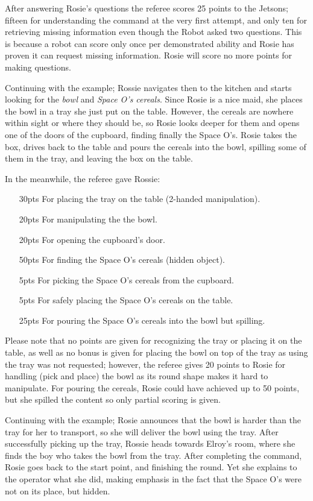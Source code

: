 After answering Rosie's questions the referee scores 25 points to the Jetsons; fifteen for understanding the command at the very first attempt, and only ten for retrieving missing information even though the Robot asked two questions. This is because a robot can score only once per demonstrated ability and Rosie has proven it can request missing information. Rosie will score no more points for making questions.

Continuing with the example; Rossie navigates then to the kitchen and starts looking for the \textit{bowl} and \textit{Space O's cereals}. Since Rosie is a nice maid, she places the bowl in a tray she just put on the table. However, the cereals are nowhere within sight or where they should be, so Rosie looks deeper for them and opens one of the doors of the cupboard, finding finally the Space O's. Rosie takes the box, drives back to the table and pours the cereals into the bowl, spilling some of them in the tray, and leaving the box on the table.

In the meanwhile, the referee gave Rossie:
\begin{itemize}
	\item[30pts] For placing the tray on the table (2-handed manipulation).
	\item[20pts] For manipulating the the bowl.
	\item[20pts] For opening the cupboard's door.
	\item[50pts] For finding the Space O's cereals (hidden object).
	\item[ 5pts] For picking the Space O's cereals from the cupboard.
	\item[ 5pts] For safely placing the Space O's cereals on the table.
	\item[25pts] For pouring the Space O's cereals into the bowl but spilling.
\end{itemize}

Please note that no points are given for recognizing the tray or placing it on the table, as well as no bonus is given for placing the bowl on top of the tray as using the tray was not requested; however, the referee gives 20 points to Rosie for handling (pick and place) the bowl as its round shape makes it hard to manipulate. For pouring the cereals, Rosie could have achieved up to 50 points, but she spilled the content so only partial scoring is given. 

Continuing with the example; Rosie announces that the bowl is harder than the tray for her to transport, so she will deliver the bowl using the tray. After successfully picking up the tray, Rossie heads towards Elroy's room, where she finds the boy who takes the bowl from the tray. After completing the command, Rosie goes back to the start point, and finishing the round. Yet she explains to the operator what she did, making emphasis in the fact that the Space O's were not on its place, but hidden.

